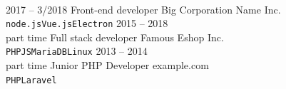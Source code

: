 \documentclass[9pt]{developercv} %
\begin{document}

\Header


\begin{minipage}[t]{0.4\textwidth} %
	\vspace{-\baselineskip} %
	
	\lorem \lorem \lorem \lorem \lorem\\ %
\end{minipage}
\hfill %
\begin{minipage}[t]{0.5\textwidth} %
	\vspace{-\baselineskip} %
	\begin{barchart}{5.5}
	\end{barchart}
\end{minipage}

\begin{center}
\end{center}


\begin{entrylist}
	\entry
		{2017 -- 3/2018}
		{Front-end developer}
		{Big Corporation Name Inc.}
		{\lorem \lorem \lorem\\ \texttt{node.js}\slashsep\texttt{Vue.js}\slashsep\texttt{Electron}}
	\entry
		{2015 -- 2018\\\footnotesize{part time}}
		{Full stack developer}
		{Famous Eshop Inc.}
		{\lorem\lorem\\ \texttt{PHP}\slashsep\texttt{JS}\slashsep\texttt{MariaDB}\slashsep\texttt{Linux}}
	\entry
		{2013 -- 2014\\\footnotesize{part time}}
		{Junior PHP Developer}
		{example.com}
		{\lorem\lorem\\ \texttt{PHP}\slashsep\texttt{Laravel}}
\end{entrylist}
\end{document}
